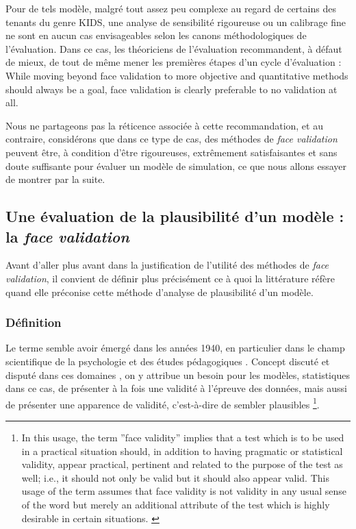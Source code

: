 Pour de tels modèle, malgré tout assez peu complexe au regard de certains des tenants du genre KIDS, une analyse de sensibilité rigoureuse ou un calibrage fine ne sont en aucun cas envisageables selon les canons méthodologiques de l'évaluation.
Dans ce cas, les théoriciens de l'évaluation recommandent, à défaut de mieux, de tout de même mener les premières étapes d'un cycle d'évaluation \autocite[342]{petty2010verification} :
	\og While moving beyond face validation to more objective and quantitative methods should always be a goal, face validation is clearly preferable to no validation at all.\fg{}

Nous ne partageons pas la réticence associée à cette recommandation, et au contraire, considérons que dans ce type de cas, des méthodes de \og \textit{face validation}\fg{} peuvent être, à condition d'être rigoureuses, extrêmement satisfaisantes et sans doute suffisante pour évaluer un modèle de simulation, ce que nous allons essayer de montrer par la suite.

\subsection{Une évaluation de la plausibilité d'un modèle : la \og \textit{face validation}\fg{}}\label{subsec:face-validity}

Avant d'aller plus avant dans la justification de l'utilité des méthodes de \textit{face validation}, il convient de définir plus précisément ce à quoi la littérature réfère quand elle préconise cette méthode d'analyse de plausibilité d'un modèle.

\subsubsection{Définition}
Le terme semble avoir émergé dans les années 1940, en particulier dans le champ scientifique de la psychologie et des études pédagogiques \autocite{nevo_face_1985}.
Concept discuté et disputé dans ces domaines \autocite{mosier_critical_1947}, on y attribue un besoin pour les modèles, statistiques dans ce cas, de présenter à la fois une validité à l'épreuve des données, mais aussi de présenter une apparence de validité, c'est-à-dire de sembler plausibles
\footnote{
	\og In this usage, the term ''face validity'' implies that a test which is to be used in a practical situation should, in addition to having pragmatic or statistical validity, appear practical, pertinent and related to the purpose of the test as well; i.e., it should not only be valid but it should also appear valid. This usage of the term assumes that \og face validity\fg{} is not validity in any usual sense of the word but merely an additional attribute of the test which is highly desirable in certain situations.\fg{} \textcite[192]{mosier_critical_1947}
}.

